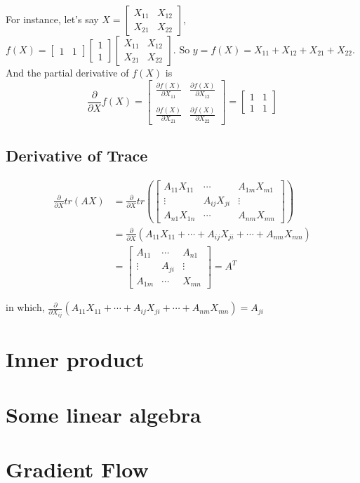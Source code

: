 \documentclass[titlepage]{article}
\begin{document}
For instance, let's say $X=\begin{bmatrix} X_{11}&X_{12}\\X_{21}&X_{22} \end{bmatrix}$,
$f(X)=\begin{bmatrix}1&1\end{bmatrix}\begin{bmatrix}1\\1\end{bmatrix}
\begin{bmatrix} X_{11}&X_{12}\\X_{21}&X_{22} \end{bmatrix}.$
So $y=f(X)=X_{11}+X_{12}+X_{21}+X_{22}.$ And the partial derivative of $f(X)$ is
\begin{equation}
    \frac{\partial}{\partial X}f(X) = 
    \begin{bmatrix} 
        \frac{\partial f(X)}{\partial X_{11}} & \frac{\partial f(X)}{\partial X_{12}} \\ \\
        \frac{\partial f(X)}{\partial X_{21}} & \frac{\partial f(X)}{\partial X_{22}}
     \end{bmatrix}
     =
     \begin{bmatrix} 
        1 & 1 \\
        1 & 1
     \end{bmatrix}
\end{equation}

\subsection{Derivative of Trace}

\begin{equation}
    \begin{aligned}
        \frac{\partial}{\partial X}tr({AX}) &= \frac{\partial}{\partial X} tr(
        \begin{bmatrix}
            A_{11}X_{11} & \cdots & A_{1m}X_{m1} \\
            \vdots & A_{ij}X_{ji} & \vdots \\
            A_{n1}X_{1n} & \cdots & A_{nm}X_{mn}
        \end{bmatrix}) \\
        &= \frac{\partial}{\partial X} 
        (A_{11}X_{11}+\cdots+A_{ij}X_{ji}+\cdots+A_{nm}X_{mn}) \\
        &=
        \begin{bmatrix}
            A_{11} & \cdots & A_{n1} \\
            \vdots & A_{ji} & \vdots \\
            A_{1m} & \cdots & X_{mn}
        \end{bmatrix}=A^T
    \end{aligned}
\end{equation}

in which, $\frac{\partial}{\partial X_{ij}}
(A_{11}X_{11}+\cdots+A_{ij}X_{ji}+\cdots+A_{nm}X_{mn})=A_{ji}$

\section{Inner product}
\section{Some linear algebra}
\section{Gradient Flow}
\end{document}
